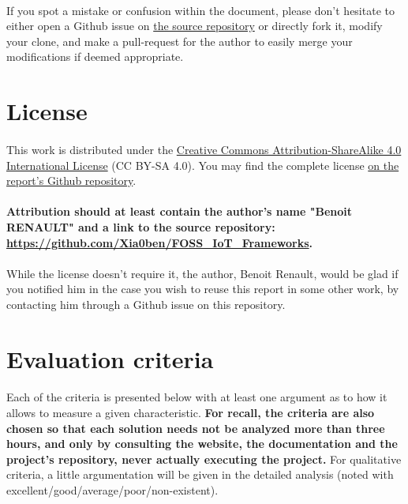 \documentclass{article}
\begin{document}
\paragraph{} If you spot a mistake or confusion within the document, please don't hesitate to either open a Github issue on \href{https://github.com/Xia0ben/FOSS_IoT_Frameworks}{the source repository} or directly fork it, modify your clone, and make a pull-request for the author to easily merge your modifications if deemed appropriate.

\section*{License}
%

\paragraph{} This work is distributed under the \href{https://creativecommons.org/licenses/by-sa/4.0/}{Creative Commons Attribution-ShareAlike 4.0 International License} (CC BY-SA 4.0). You may find the complete license \href{https://github.com/Xia0ben/FOSS_IoT_Frameworks/blob/master/LICENSE}{on the report's Github repository}.

\paragraph{} \textbf{Attribution should at least contain the author's name "Benoit RENAULT" and a link to the source repository: \url{https://github.com/Xia0ben/FOSS_IoT_Frameworks}.}

\paragraph{} While the license doesn't require it, the author, Benoit Renault, would be glad if you notified him in the case you wish to reuse this report in some other work, by contacting him through a Github issue on this repository.

\newpage

\section{Evaluation criteria}

\paragraph{} Each of the criteria is presented below with at least one argument as to how it allows to measure a given characteristic. \textbf{For recall, the criteria are also chosen so that each solution needs not be analyzed more than three hours, and only by consulting the website, the documentation and the project's repository, never actually executing the project.} For qualitative criteria, a little argumentation will be given in the detailed analysis (noted with excellent/good/average/poor/non-existent).
\end{document}
